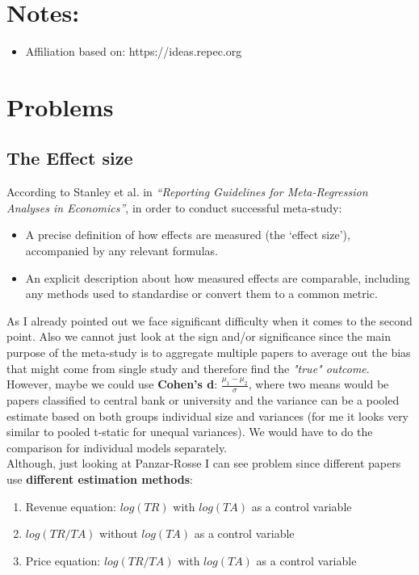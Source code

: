 \documentclass{article}
\begin{document}
\section{Notes:}

\begin{itemize}
    \item Affiliation based on: https://ideas.repec.org
\end{itemize}


\section{Problems}

\subsection*{The Effect size}

According to Stanley et al. in \textit{“Reporting Guidelines for Meta-Regression Analyses in Economics”}, in order to conduct successful meta-study:
\begin{itemize}
    \item A precise definition of how effects are measured (the ‘effect size’), accompanied by any relevant formulas.
    \item An explicit description about how measured effects are comparable, including any methods used to standardise or convert them to a common metric.
\end{itemize}

\newline \noindent
As I already pointed out we face significant difficulty when it comes to the second point. Also we cannot just look at the sign and/or significance since the main purpose of the meta-study is to aggregate multiple papers to average out the bias that might come from single study and therefore find the \textit{"true" outcome}.   \\

\newline \noindent
However, maybe we could use \textbf{Cohen’s d}: $\frac{\mu_1 - \mu_2}{\sigma}$, where two means would be papers classified to central bank or university and the variance can be a pooled estimate based on both groups individual size and variances (for me it looks very similar to pooled t-static for unequal variances). We would have to do the comparison for individual models separately. \\

\newline \noindent
Although, just looking at Panzar-Rosse I can see problem since different papers use \textbf{different estimation methods}:
\begin{enumerate}
    \item Revenue equation: $log(TR)$ with $log(TA)$ as a control variable
    \item $log(TR/TA)$  without $log(TA)$ as a control variable
    \item Price equation: $log(TR/TA)$ with $log(TA)$ as a control variable
\end{enumerate}
\end{document}
